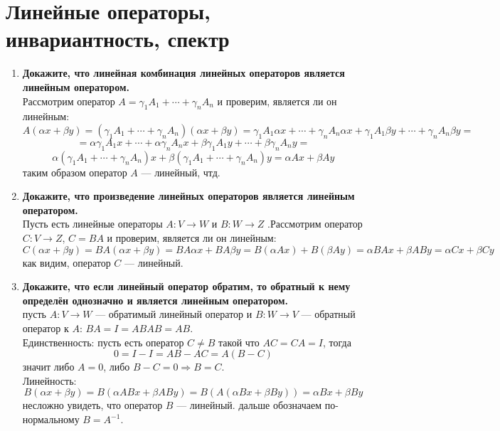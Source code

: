 \documentclass[12pt]{article} %
\begin{document}


\tableofcontents

\section{Линейные операторы, инвариантность, спектр}

\begin{enumerate}
    \item \textbf{Докажите, что линейная комбинация линейных операторов является линейным оператором.}\\
    
    Рассмотрим оператор $A = \gamma_1 A_1 + \cdots + \gamma_n A_n$ и проверим, является ли он линейным:
    \[
    A(\alpha x + \beta y) = (\gamma_1 A_1 + \cdots + \gamma_n A_n)(\alpha x + \beta y) = \gamma_1 A_1 \alpha x + \cdots + \gamma_n A_n \alpha x + \gamma_1 A_1 \beta y + \cdots + \gamma_n A_n \beta y = \]\[
    = \alpha \gamma_1 A_1  x + \cdots + \alpha \gamma_n A_n  x + \beta \gamma_1 A_1  y + \cdots + \beta \gamma_n A_n  y =\]\[ \alpha(\gamma_1 A_1 + \cdots + \gamma_n A_n)x + \beta(\gamma_1 A_1 + \cdots + \gamma_n A_n)y = \alpha A x + \beta A y
    \]
    таким образом оператор $A$ --- линейный, чтд.
    \item \textbf{Докажите, что произведение линейных операторов является линейным оператором.}\\
    
     Пусть есть линейные операторы $A: V \rightarrow W$ и $B : W \rightarrow Z$ .Рассмотрим оператор $C : V \rightarrow Z$, $C = BA$ и проверим, является ли он линейным:
     \[
     C(\alpha x + \beta y) = BA(\alpha x + \beta y) = BA\alpha x + BA \beta y = B (\alpha A x) + B(\beta A  y) = \alpha BA x + \beta AB y = \alpha C x + \beta C y
     \]
     как видим, оператор $C$ --- линейный.
    \item \textbf{Докажите, что если линейный оператор обратим, то обратный к нему определён однозначно и является линейным оператором.}\\
    
    пусть $A : V \rightarrow W$ --- обратимый линейный оператор и $B : W \rightarrow V$ --- обратный оператор к $A$: $BA = I = ABAB = AB$.  \\
    Единственность: пусть есть оператор $C \neq B$ такой что $AC = CA = I$, тогда 
    \[
    0 = I - I = AB - AC = A(B - C)
    \]
    значит либо $A = 0$, либо $B - C = 0 \Rightarrow B = C$.\\
    Линейность: \[
    B(\alpha x + \beta y) = B(\alpha AB x + \beta AB y) = B(A(\alpha B x + \beta B y)) = \alpha B x + \beta B y
    \]
    несложно увидеть, что оператор $B$ --- линейный. дальше обозначаем по-нормальному $B = A^{-1}$.
    

\end{enumerate}
\end{document}
